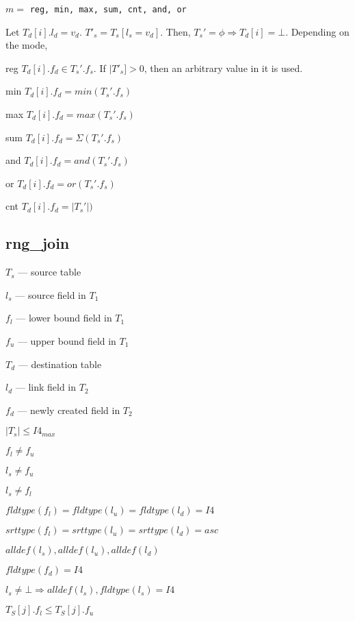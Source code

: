 \documentclass{report}
\begin{document}
\be
\item 
\(m = \) {\tt reg, min, max, sum, cnt, and, or}
\ee


Let \(T_d[i].l_d = v_d\). \(T'_s = T_s[l_s = v_d]\). 
Then, \(T_s' = \phi \Rightarrow T_d[i] = \bot\).  Depending on the mode, 
\bd
\item [reg] \(T_d[i].f_d \in T_s'.f_s\). If \(|T'_s] > 0 \), then an
arbitrary value in it is used.
\item [min] \(T_d[i].f_d = min(T_s'.f_s)\)
\item [max] \(T_d[i].f_d = max(T_s'.f_s)\)
\item [sum] \(T_d[i].f_d = \Sigma(T_s'.f_s)\)
\item [and] \(T_d[i].f_d = and(T_s'.f_s)\)
\item [or ] \(T_d[i].f_d = or(T_s'.f_s)\)
\item [cnt] \(T_d[i].f_d = |T_s'|)\)
\ed

\subsection{rng\_join}
\label{rng_join}

\be
\item \(T_s\) --- source table
\item \(l_s\) --- source field in \(T_1\)
\item \(f_l\) --- lower bound field in \(T_1\)
\item \(f_u\) --- upper bound field in \(T_1\)
\item \(T_d\) --- destination table
\item \(l_d\) --- link field in \(T_2\)
\item \(f_d\) --- newly created field in \(T_2\)
\ee

%
\be
\item \(|T_s| \leq I4_{max}\)
\item \(f_l \neq f_u\)
\item \(l_s \neq f_u\)
\item \(l_s \neq f_l\)
\item \(fldtype(f_l) = fldtype(l_u) = fldtype(l_d) = I4\)
\item \(srttype(f_l) = srttype(l_u) = srttype(l_d) = asc\)
\item \(alldef(l_s),   alldef(l_u),   alldef(l_d)\)
\item \(fldtype(f_d) = I4\)
\item \(l_s \neq \bot \Rightarrow alldef(l_s), fldtype(l_s) = I4\)
\item \(T_S[j].f_l \leq T_S[j].f_u\)
\ee
\end{document}
